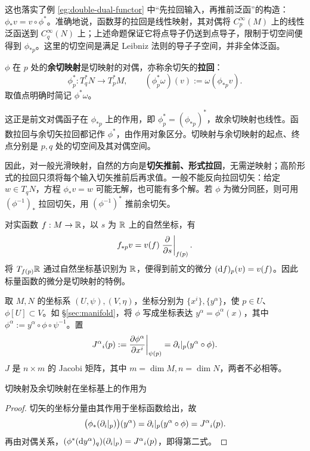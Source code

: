 这也落实了例 \ref{eg:double-dual-functor} 中“先拉回输入，再推前泛函”的构造：$\phi_*v=v\circ\phi^*$。准确地说，函数芽的拉回是线性映射，其对偶将 $C^\infty_p(M)$ 上的线性泛函送到 $C^\infty_q(N)$ 上；上述命题保证它将点导子仍送到点导子，限制于切空间便得到 $\phi_{*p}$。这里的切空间是满足 Leibniz 法则的导子子空间，并非全体泛函。

\begin{definition}
    $\phi$ 在 $p$ 处的\textbf{余切映射}是切映射的对偶，亦称余切矢的\textbf{拉回}：
    \[
        \phi_p^*:T_q^*N\to T_p^*M,\qquad
        (\phi_p^*\omega)(v):=\omega(\phi_{*p}v).
    \]
    取值点明确时简记 $\phi^*\omega$。
\end{definition}

这正是前文对偶函子在 $\phi_{*p}$ 上的作用，即 $\phi_p^*=(\phi_{*p})^*$，故余切映射也线性。函数拉回与余切矢拉回都记作 $\phi^*$，由作用对象区分。切映射与余切映射的起点、终点分别是 $p,q$ 处的切空间及其对偶空间。

因此，对一般光滑映射，自然的方向是\textbf{切矢推前、形式拉回}，无需逆映射；高阶形式的拉回只须将每个输入切矢推前后再求值。一般不能反向拉回切矢：给定 $w\in T_qN$，方程 $\phi_*v=w$ 可能无解，也可能有多个解。若 $\phi$ 为微分同胚，则可用 $(\phi^{-1})_*$ 拉回切矢，用 $(\phi^{-1})^*$ 推前余切矢。

\begin{remark}
    对实函数 $f:M\to\mathbb{R}$，以 $s$ 为 $\mathbb{R}$ 上的自然坐标，有
    \[
        f_{*p}v=v(f)\left.\pdv{s}\right|_{f(p)}.
    \]
    将 $T_{f(p)}\mathbb{R}$ 通过自然坐标基识别为 $\mathbb{R}$，便得到前文的微分 $(\dd f)_p(v)=v(f)$。因此标量函数的微分是切映射的特例。
\end{remark}

取 $M,N$ 的坐标系 $(U,\psi),(V,\eta)$，坐标分别为 $\{x^i\},\{y^\alpha\}$，使 $p\in U$、$\phi[U]\subset V$。如 \S\ref{sec:manifold}，将 $\phi$ 写成坐标表达 $y^\alpha=\phi^\alpha(x)$，其中 $\phi^\alpha:=y^\alpha\circ\phi\circ\psi^{-1}$。置
\[
    J^\alpha{}_i(p):=\pdv{\phi^\alpha}{x^i}\bigg|_{\psi(p)}
    =\partial_i|_p(y^\alpha\circ\phi).
\]
$J$ 是 $n\times m$ 的 Jacobi 矩阵，其中 $m=\dim M,n=\dim N$，两者不必相等。

\begin{proposition}
    切映射及余切映射在坐标基上的作用为
\end{proposition}
\begin{proof}
    切矢的坐标分量由其作用于坐标函数给出，故
    \[
        \bigl(\phi_*(\partial_i|_p)\bigr)(y^\alpha)
        =\partial_i|_p(y^\alpha\circ\phi)=J^\alpha{}_i(p).
    \]
    再由对偶关系，$(\phi^*(\dd y^\alpha)_q)(\partial_i|_p)=J^\alpha{}_i(p)$，即得第二式。
\end{proof}

